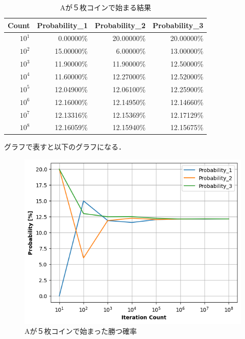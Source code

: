 \documentclass[a4j, titlepage]{jarticle}
\begin{document}
        \begin{longtable}[c]{|r|r|r|r|}
          \caption{Aが５枚コインで始まる結果}
          \label{tab:coin5}\\
          \hline
          \rowcolor[HTML]{C0C0C0} 
          Count    & Probability\_1 & Probability\_2 & Probability\_3 \\ \hline
          \endfirsthead
          \endhead
          $10^1$   &  0.00000\%       & 20.00000\%       & 20.00000\%       \\ \hline
          $10^2$   & 15.00000\%       &  6.00000\%       & 13.00000\%       \\ \hline
          $10^3$   & 11.90000\%       & 11.90000\%       & 12.50000\%       \\ \hline
          $10^4$   & 11.60000\%       & 12.27000\%       & 12.52000\%       \\ \hline
          $10^5$   & 12.04900\%       & 12.06100\%       & 12.25900\%       \\ \hline
          $10^6$   & 12.16000\%       & 12.14950\%       & 12.14660\%       \\ \hline
          $10^7$   & 12.13316\%       & 12.15369\%       & 12.17129\%       \\ \hline
          $10^8$   & 12.16059\%       & 12.15940\%       & 12.15675\%       \\ \hline
        \end{longtable}

        グラフで表すと以下のグラフになる．
        \begin{figure}[htb]
          \begin{center}
            \includegraphics[scale=0.55]{../Dir_Coin/img_coin5.png}
            \caption{Aが５枚コインで始まった勝つ確率}
            \label{img:coin5}
          \end{center}
        \end{figure}
\end{document}
